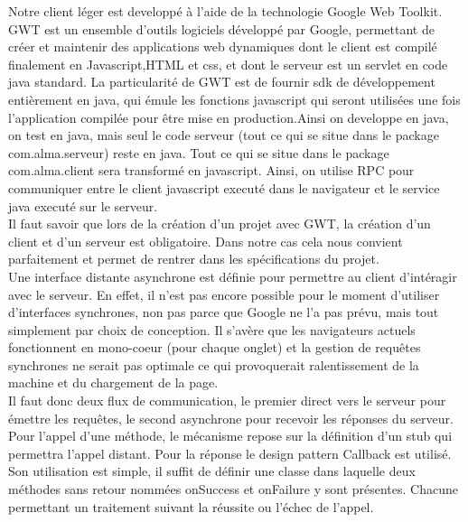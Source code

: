 Notre client léger est developpé à l'aide de la technologie Google Web Toolkit. GWT est un ensemble d'outils logiciels développé par Google, permettant de créer et maintenir des applications web dynamiques dont le client est compilé finalement en Javascript,HTML et css, et dont le serveur est un servlet en code java standard. La particularité de GWT est de fournir sdk de développement  entièrement en java, qui émule les fonctions javascript qui seront utilisées une fois l'application compilée pour être mise en production.Ainsi on developpe en java, on test en java, mais seul le code serveur (tout ce qui se situe dans le package com.alma.serveur) reste en java. Tout ce qui se situe dans le package com.alma.client sera transformé en javascript. Ainsi, on utilise RPC pour communiquer entre le client javascript executé dans le navigateur et le service java executé sur le serveur.\\
Il faut savoir que lors de la création d'un projet avec GWT, la création d'un client et d'un serveur est obligatoire. Dans notre cas cela nous convient parfaitement et permet de rentrer dans les spécifications du projet.
\\ \indent
Une interface distante asynchrone est définie pour permettre au client d'intéragir avec le serveur. En effet, il n'est pas encore possible pour le moment d'utiliser d'interfaces synchrones, non pas parce que Google ne l'a pas prévu, mais tout simplement par choix de conception. Il s'avère que les navigateurs actuels fonctionnent en mono-coeur (pour chaque onglet) et la gestion de requêtes synchrones ne serait pas optimale ce qui provoquerait ralentissement de la machine et du chargement de la page.
\\ \indent
Il faut donc deux flux de communication, le premier direct vers le serveur pour émettre les requêtes, le second asynchrone pour recevoir les réponses du serveur. Pour l'appel d'une méthode, le mécanisme repose sur la définition d'un stub qui permettra l'appel distant. Pour la réponse le design pattern Callback est utilisé. Son utilisation est simple, il suffit de définir une classe dans laquelle deux méthodes sans retour nommées onSuccess et onFailure y sont présentes. Chacune permettant un traitement suivant la réussite ou l'échec de l'appel.
\\ \indent

